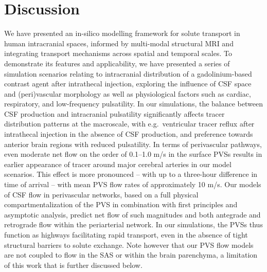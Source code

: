\documentclass[fleqn,10pt]{wlscirep}
\begin{document}
\section*{Discussion}

We have presented an in-silico modelling framework for solute
transport in human intracranial spaces, informed by multi-modal
structural MRI and integrating transport mechanisms across spatial and
temporal scales. To demonstrate its features and applicability, we
have presented a series of simulation scenarios relating to
intracranial distribution of a gadolinium-based contrast agent after
intrathecal injection, exploring the influence of CSF space and
(peri)vascular morphology as well as physiological factors such as
cardiac, respiratory, and low-frequency pulsatility. In our
simulations, the balance between CSF production and intracranial
pulsatility significantly affects tracer distribution patterns at the
macroscale, with e.g.~ventricular tracer reflux after intrathecal
injection in the absence of CSF production, and preference towards
anterior brain regions with reduced pulsatility. In terms of
perivascular pathways, even moderate net flow on the order of 0.1--1.0
\textmu m/s in the surface PVSs results in earlier appearance of
tracer around major cerebral arteries in our model scenarios. This
effect is more pronounced -- with up to a three-hour difference in
time of arrival -- with mean PVS flow rates of approximately 10
\textmu m/s. Our models of CSF flow in perivascular networks, based on
a full physical compartmentalization of the PVS in combination with first principles and asymptotic analysis, predict net flow of such
magnitudes and both antegrade and retrograde flow within the
periarterial network. In our simulations, the PVSs thus function as
highways facilitating rapid transport, even in the absence of tight
structural barriers to solute exchange. Note however that our PVS 
flow models are not coupled to flow in the SAS or within the brain 
parenchyma, a limitation of this work that is further discussed below.


\end{document}
